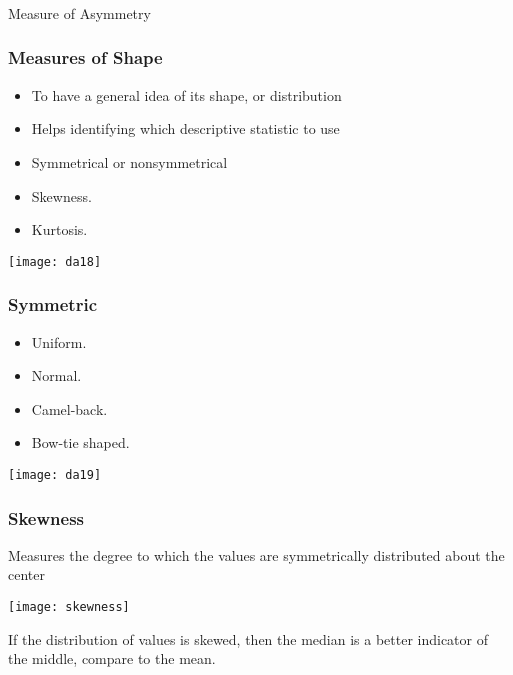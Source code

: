 
\begin{frame}[fragile]\frametitle{}
\begin{center}
{\Large Measure of Asymmetry}
\end{center}
\end{frame}

\begin{frame}[fragile]\frametitle{Measures of Shape}	
\begin{itemize}
\item  To have a general idea of its shape, or distribution
\item Helps identifying which descriptive statistic to use
\item  Symmetrical or nonsymmetrical
\item Skewness.
\item Kurtosis.
\end{itemize}
\begin{center}
\texttt{[image: da18]}
\end{center}
\end{frame}

\begin{frame}[fragile]\frametitle{Symmetric}	
\begin{itemize}

\item  Uniform.
\item  Normal.
\item  Camel-back.
\item  Bow-tie shaped.
\end{itemize}
\begin{center}
\texttt{[image: da19]}
\end{center}
\end{frame}

\begin{frame}[fragile]\frametitle{Skewness}	
Measures the degree to which the values are symmetrically distributed about the center
\begin{center}
\texttt{[image: skewness]}
\end{center}
If the distribution of values is skewed, then the median is a better indicator of the middle, compare to the mean.
\end{frame}

